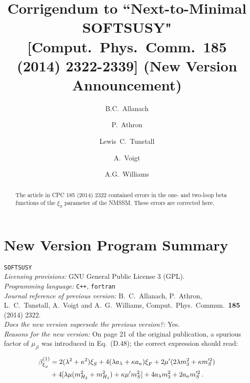 \documentclass[final,3p,times,pdflatex]{elsarticle}
\def\SOFTSUSY{{\tt SOFTSUSY}}
\newcommand{\lamsq}{\lambda^2}
\newcommand{\kapsq}{\kappa^2}
\newcommand{\mhusq}{m^2_{H_2}}
\newcommand{\mhdsq}{m^2_{H_1}}
\newcommand{\mssq}{m_S^2}
\begin{document}
\begin{frontmatter}

\title{Corrigendum to ``Next-to-Minimal SOFTSUSY" [Comput.\ Phys.\ Comm.\ 185 (2014) 2322-2339] (New Version Announcement)}

\author[damtp]{B.C.~Allanach}
\author[adelaide]{P.~Athron}
\author[adelaide,bern]{Lewis~C.~Tunstall}
\author[dresden]{A.~Voigt}
\author[adelaide]{A.G.~Williams}
\address[damtp]{DAMTP, CMS, University of Cambridge, Wilberforce road, Cambridge, CB3
  0WA, United Kingdom}
\address[adelaide]{ARC Centre of Excellence for Particle Physics at
the Tera-scale, School of Chemistry and Physics, University of Adelaide,
Adelaide SA 5005 Australia}
\address[bern]{Albert Einstein Center for Fundamental Physics, Institute for Theoretical Physics, University of Bern, Sidlerstrasse 5, CH-3012 Bern, Switzerland}
\address[dresden]{Institut f\"ur Kern- und Teilchenphysik,
TU Dresden, Zellescher Weg 19, 01069 Dresden, Germany}

\begin{abstract}
  The article in CPC 185 (2014) 2322 contained errors in the one- and two-loop beta functions of the $\xi_S$ parameter of the NMSSM. These errors are corrected here.
\end{abstract}

\end{frontmatter}

\section{New Version Program Summary}
 \SOFTSUSY{}\\
{\em Licensing provisions:} GNU General Public License 3 (GPL). \\
{\em Programming language:} {\tt C++}, {\tt fortran}\\
{\em Journal reference of previous version:} B.~C.~Allanach, P.~Athron, L.~C.~Tunstall, A.~Voigt and A.~G.~Williams, Comput.\ Phys.\ Commun.\  {\bf 185} (2014) 2322. \\
{\em Does the new version supersede the previous version?:} Yes.\\
{\em Reasons for the new version:} 
On page 21 of the original publication, a spurious factor of $\mu_{jl}$ was introduced in Eq.\ (D.48); the correct expression should read:

\begin{align}
  \beta_{\xi^{}_S}^{(1)} &= 2(\lamsq + \kapsq)\xi^{}_S + 4(\lambda a_\lambda + \kappa a_\kappa)\xi^{}_F + 2\mu'(2\lambda m_3^2 + \kappa m_S'^2) \notag \\
%
&+ 4[\lambda\mu (\mhusq + \mhdsq) + \kappa\mu' \mssq] + 4a_\lambda m_3^2 + 2a_\kappa m_S'^2\,.
\end{align}
\end{document}
